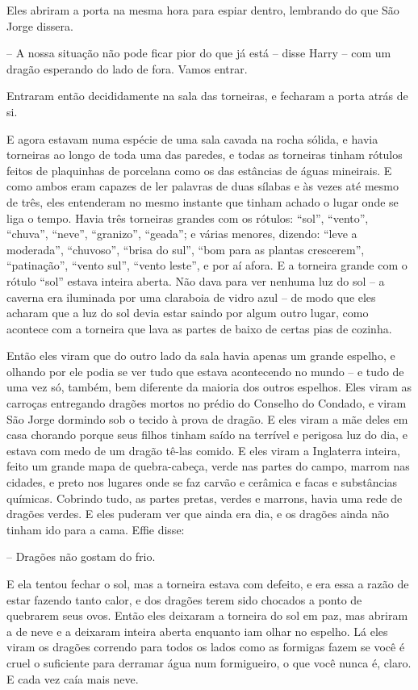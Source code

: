 Eles abriram a porta na mesma hora para espiar dentro, lembrando do
que São Jorge dissera.

-- A nossa situação não pode ficar pior do que já está -- disse Harry --
com um dragão esperando do lado de fora. Vamos entrar.

Entraram então decididamente na sala das torneiras, e fecharam a porta
atrás de si.

E agora estavam numa espécie de uma sala cavada na rocha sólida, e
havia torneiras ao longo de toda uma das paredes, e todas as
torneiras tinham rótulos feitos de plaquinhas de porcelana como os
das estâncias de águas mineirais. E como ambos eram capazes de ler
palavras de duas sílabas e às vezes até mesmo de três, eles
entenderam no mesmo instante que tinham achado o lugar onde se liga o
tempo. Havia três torneiras grandes com os rótulos: “sol”, “vento”,
“chuva”, “neve”, “granizo”, “geada”; e várias menores, dizendo: “leve
a moderada”, “chuvoso”, “brisa do sul”, “bom para as plantas
crescerem”, “patinação”, “vento sul”, “vento leste”, e por aí afora.
E a torneira grande com o rótulo “sol” estava inteira aberta. Não
dava para ver nenhuma luz do sol -- a caverna era iluminada por uma
claraboia de vidro azul -- de modo que eles acharam que a luz do sol
devia estar saindo por algum outro lugar, como acontece com a
torneira que lava as partes de baixo de certas pias de cozinha.

Então eles viram que do outro lado da sala havia apenas um grande
espelho, e olhando por ele podia se ver tudo que estava acontecendo
no mundo -- e tudo de uma vez só, também, bem diferente da maioria dos
outros espelhos. Eles viram as carroças entregando dragões mortos no
prédio do Conselho do Condado, e viram São Jorge dormindo sob o
tecido à prova de dragão. E eles viram a mãe deles em casa chorando
porque seus filhos tinham saído na terrível e perigosa luz do dia, e
estava com medo de um dragão tê-las comido. E eles viram a Inglaterra
inteira, feito um grande mapa de quebra-cabeça, verde nas partes do
campo, marrom nas cidades, e preto nos lugares onde se faz carvão e
cerâmica e facas e substâncias químicas. Cobrindo tudo, as partes
pretas, verdes e marrons, havia uma rede de dragões verdes. E eles
puderam ver que ainda era dia, e os dragões ainda não tinham ido para
a cama. Effie disse:

-- Dragões não gostam do frio.

E ela tentou fechar o sol, mas a torneira estava com defeito, e era
essa a razão de estar fazendo tanto calor, e dos dragões terem sido
chocados a ponto de quebrarem seus ovos. Então eles deixaram a
torneira do sol em paz, mas abriram a de neve e a deixaram inteira
aberta enquanto iam olhar no espelho. Lá eles viram os dragões
correndo para todos os lados como as formigas fazem se você é cruel o
suficiente para derramar água num formigueiro, o que você nunca é,
claro. E cada vez caía mais neve.

